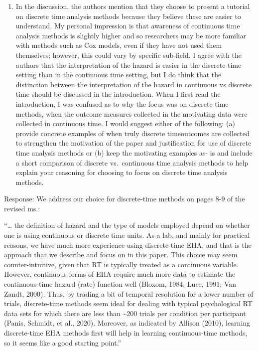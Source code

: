 \documentclass[
]{article}
\providecommand{\tightlist}{%
  \setlength{\itemsep}{0pt}\setlength{\parskip}{0pt}}
\renewenvironment{quote}{\begin{leftbar}}{\end{leftbar}}
\begin{document}
\begin{quote}
\begin{enumerate}
\def\labelenumi{\arabic{enumi}.}
\setcounter{enumi}{1}
\tightlist
\item
  In the discussion, the authors mention that they choose to present a
  tutorial on discrete time analysis methods because they believe these
  are easier to understand. My personal impression is that awareness of
  continuous time analysis methods is slightly higher and so researchers
  may be more familiar with methods such as Cox models, even if they
  have not used them themselves; however, this could vary by specific
  sub-field. I agree with the authors that the interpretation of the
  hazard is easier in the discrete time setting than in the continuous
  time setting, but I do think that the distinction between the
  interpretation of the hazard in continuous vs discrete time should be
  discussed in the introduction. When I first read the introduction, I
  was confused as to why the focus was on discrete time methods, when
  the outcome measures collected in the motivating data were collected
  in continuous time. I would suggest either of the following: (a)
  provide concrete examples of when truly discrete timeoutcomes are
  collected to strengthen the motivation of the paper and justification
  for use of discrete time analysis methods or (b) keep the motivating
  examples as- is and include a short comparison of discrete
  vs.~continuous time analysis methods to help explain your reasoning
  for choosing to focus on discrete time analysis methods.
\end{enumerate}
\end{quote}

Response: We address our choice for discrete-time methods on pages 8-9
of the revised ms.:

``\ldots{} the definition of hazard and the type of models employed
depend on whether one is using continuous or discrete time units. As a
lab, and mainly for practical reasons, we have much more experience
using discrete-time EHA, and that is the approach that we describe and
focus on in this paper. This choice may seem counter-intuitive, given
that RT is typically treated as a continuous variable. However,
continuous forms of EHA require much more data to estimate the
continuous-time hazard (rate) function well (Bloxom, 1984; Luce, 1991;
Van Zandt, 2000). Thus, by trading a bit of temporal resolution for a
lower number of trials, discrete-time methods seem ideal for dealing
with typical psychological RT data sets for which there are less than
\textasciitilde200 trials per condition per participant (Panis, Schmidt,
et al., 2020). Moreover, as indicated by Allison (2010), learning
discrete-time EHA methods first will help in learning continuous-time
methods, so it seems like a good starting point.''
\end{document}
